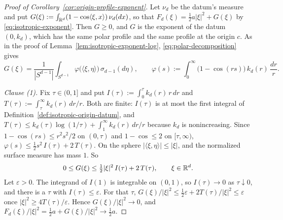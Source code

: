 \begin{proof}[Proof of Corollary~\ref{cor:origin-profile-exponent}]
Let $\nu_d$ be the datum's \Levy{} measure and put
$G(\xi) := \int_{\mathbb{R}^d}(1 - \cos\langle\xi,x\rangle)\,\nu_d(dx)$, so that
$F_d(\xi) = \tfrac12 a|\xi|^2 + G(\xi)$ by \ref{eq:isotropic-exponent}. Then $G \ge 0$, and $G$ is the
exponent of the datum $(0,k_d)$, which has the same polar profile and the same profile at the origin
$c$. As in the proof of Lemma~\ref{lem:isotropic-exponent-log}, \ref{eq:polar-decomposition} gives
\[
  G(\xi) = \frac{1}{|S^{d-1}|}\int_{S^{d-1}}\varphi\bigl(\langle\xi,\eta\rangle\bigr)\,\sigma_{d-1}(d\eta),
  \qquad
  \varphi(s) := \int_0^\infty\bigl(1 - \cos(rs)\bigr)\,k_d(r)\,\frac{dr}{r} .
\]

\emph{Clause (1).} Fix $\tau \in (0,1]$ and put $I(\tau) := \int_0^\tau k_d(r)\,r\,dr$ and
$T(\tau) := \int_\tau^\infty k_d(r)\,dr/r$. Both are finite: $I(\tau)$ is at most the first integral
of Definition~\ref{def:isotropic-origin-datum}, and
$T(\tau) \le k_d(\tau)\log(1/\tau) + \int_1^\infty k_d(r)\,dr/r$ because $k_d$ is nonincreasing.
Since $1 - \cos(rs) \le r^2s^2/2$ on $(0,\tau)$ and $1 - \cos \le 2$ on $[\tau,\infty)$,
$\varphi(s) \le \tfrac12 s^2\,I(\tau) + 2\,T(\tau)$. On the sphere
$|\langle\xi,\eta\rangle| \le |\xi|$, and the normalized surface measure has mass $1$. So
\[
  0 \le G(\xi) \le \tfrac12|\xi|^2\,I(\tau) + 2\,T(\tau), \qquad \xi \in \mathbb{R}^d .
\]
Let $\varepsilon > 0$. The integrand of $I(1)$ is integrable on $(0,1)$, so $I(\tau) \to 0$ as
$\tau \downarrow 0$, and there is a $\tau$ with $I(\tau) \le \varepsilon$. For that $\tau$,
$G(\xi)/|\xi|^2 \le \tfrac12\varepsilon + 2T(\tau)/|\xi|^2 \le \varepsilon$ once
$|\xi|^2 \ge 4T(\tau)/\varepsilon$. Hence $G(\xi)/|\xi|^2 \to 0$, and
$F_d(\xi)/|\xi|^2 = \tfrac12 a + G(\xi)/|\xi|^2 \to \tfrac12 a$.


\end{proof}
